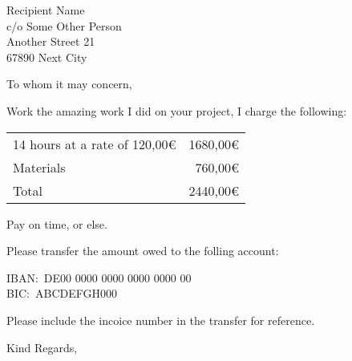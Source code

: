 \documentclass[
	11pt,
	a4paper,
	letter,
	parskip=yes,
	fromemail,
	fromphone
]{scrlttr2} %
\date{\formatdate{24}{11}{2023} }
\begin{document}
\begin{letter}{%
		Recipient Name\\
		c/o Some Other Person\\
		Another Street 21\\[\medskipamount]
		67890 Next City}


	\opening{To whom it may concern,}

	Work the amazing work I did on your project, I charge the following:

	\begin{tabularx}{\textwidth}{Xr}
		14 hours at a rate of 120,00€		&  1680,00€ \\
		Materials 											&   760,00€ \\
		\midrule
		Total														& 2440,00€ \\
		\bottomrule
	\end{tabularx}

	Pay on time, or else.

	Please transfer the amount owed to the folling account:

	IBAN:\ DE00 0000 0000 0000 0000 00\\
	BIC:\ ABCDEFGH000

	Please include the incoice number in the transfer for reference.

	\closing{Kind Regards,}

\end{letter}
\end{document}
